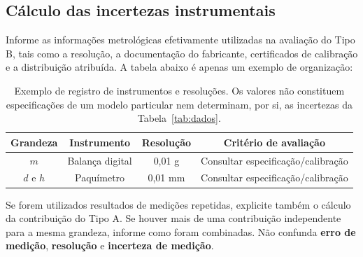 \documentclass[aps,prb,12pt,onecolumn,amsmath,amssymb]{revtex4-2}
\begin{document}
\subsection{Cálculo das incertezas instrumentais}
Informe as informações metrológicas efetivamente utilizadas na avaliação do Tipo B, tais como a resolução, a documentação do fabricante, certificados de calibração e a distribuição atribuída. A tabela abaixo é apenas um exemplo de organização:
\begin{table}[ht]
    \centering
    \begin{tabular}{cccc}
        \toprule
        Grandeza & Instrumento & Resolução & Critério de avaliação \\
        \midrule
        $m$ & Balança digital & 0,01 g & Consultar especificação/calibração \\
        $d$ e $h$ & Paquímetro & 0,01 mm & Consultar especificação/calibração \\
        \bottomrule
    \end{tabular}
    \caption{Exemplo de registro de instrumentos e resoluções. Os valores não constituem especificações de um modelo particular nem determinam, por si, as incertezas da Tabela~\ref{tab:dados}.}
    \label{tab:incertezas}
\end{table}

Se forem utilizados resultados de medições repetidas, explicite também o cálculo da contribuição do Tipo A. Se houver mais de uma contribuição independente para a mesma grandeza, informe como foram combinadas. Não confunda \textbf{erro de medição}, \textbf{resolução} e \textbf{incerteza de medição}.

\end{document}
